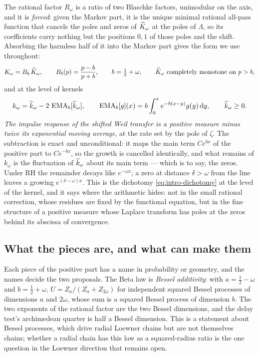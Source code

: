 The rational factor $R_\omega$ is a ratio of two Blaschke factors, unimodular
on the axis, and it is \emph{forced}: given the Markov part, it is the unique
minimal rational all-pass function that cancels the poles and zeros of
$\widetilde K_\omega$ at the poles of $\Lambda$, so its coefficients carry nothing but
the positions $0,1$ of those poles and the shift. Absorbing the harmless half
of it into the Markov part gives the form we use throughout:
\begin{equation}\label{eq:intro-decomp}
 K_\omega=B_b\,\widehat K_\omega,\qquad B_b(p)=\frac{p-b}{p+b},\qquad b=\tfrac12+\omega,
 \qquad \widehat K_\omega\ \text{completely monotone on }p>b,
\end{equation}
and at the level of kernels
\begin{equation}\label{eq:intro-ema}
 k_\omega=\widehat k_\omega-2\,\operatorname{EMA}_b[\widehat k_\omega],\qquad
 \operatorname{EMA}_b[g](x)=b\int_0^xe^{-b(x-y)}g(y)\,\mathrm d y,\qquad \widehat k_\omega\geq0 .
\end{equation}
\emph{The impulse response of the shifted Weil transfer is a positive measure
minus twice its exponential moving average}, at the rate set by the pole of
$\zeta$. The subtraction is exact and unconditional: it maps the main term
$Ce^{bx}$ of the positive part to $Ce^{-bx}$, so the growth is cancelled
identically, and what remains of $k_\omega$ is the fluctuation of $\widehat k_\omega$
about its main term --- which is to say, the zeros. Under RH the remainder
decays like $e^{-\omega x}$; a zero at distance $\delta>\omega$ from the line
leaves a growing $e^{(\delta-\omega)x}$. This is the dichotomy
\eqref{eq:intro-dichotomy} at the level of the kernel, and it says where the
arithmetic hides: not in the small rational correction, whose residues are
fixed by the functional equation, but in the fine structure of a positive
measure whose Laplace transform has poles at the zeros behind its abscissa of
convergence.

\subsection{What the pieces are, and what can make them}

Each piece of the positive part has a name in probability or geometry, and the
names decide the two proposals. The Beta law is \emph{Bessel additivity}: with
$a=\frac12-\omega$ and $b=\frac12+\omega$, $U=Z_a/(Z_a+Z_{2\omega})$ for
independent squared Bessel processes of dimensions $a$ and $2\omega$, whose sum
is a squared Bessel process of dimension $b$. The two exponents of the rational
factor are the two Bessel dimensions, and the delay test's archimedean quarter
is half a Bessel dimension. This is a statement about Bessel processes, which
drive radial Loewner chains but are not themselves chains; whether a radial
chain has this law as a squared-radius ratio is the one question in the Loewner
direction that remains open.

